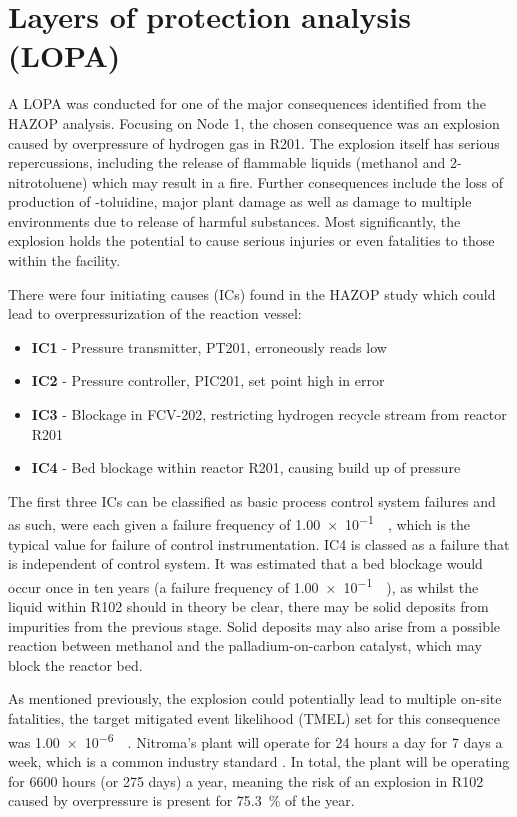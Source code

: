 \section{Layers of protection analysis (LOPA)}
\label{sec:LOPA}

A LOPA was conducted for one of the major consequences identified from the HAZOP analysis. Focusing on Node 1, the chosen consequence was an explosion caused by overpressure of hydrogen gas in R201. The explosion itself has serious repercussions, including the release of flammable liquids (methanol and 2-nitrotoluene) which may result in a fire. Further consequences include the loss of production of \ortho-toluidine, major plant damage as well as damage to multiple environments due to release of harmful substances. Most significantly, the explosion holds the potential to cause serious injuries or even fatalities to those within the facility. 

There were four initiating causes (ICs) found in the HAZOP study which could lead to overpressurization of the reaction vessel:

\begin{itemize}
\item \textbf{IC1} - Pressure transmitter, PT201, erroneously reads low 
\item \textbf{IC2} -  Pressure controller, PIC201, set point high in error
\item \textbf{IC3 }- Blockage in FCV-202, restricting hydrogen recycle stream from reactor R201 
\item \textbf{IC4} - Bed blockage within reactor R201, causing build up of pressure 
\end{itemize}

The first three ICs can be classified as basic process control system failures and as such, were each given a failure frequency of \SI{1.00e-1}{\per\year}, which is the typical value for failure of control instrumentation. IC4 is classed as a failure that is independent of control system. It was estimated that a bed blockage would occur once in ten years (a failure frequency of \SI{1.00e-1}{\per\year}), as whilst the liquid within R102 should in theory be clear, there may be solid deposits from impurities from the previous stage. Solid deposits may also arise from a possible reaction between methanol and the palladium-on-carbon catalyst, which may block the reactor bed. 

As mentioned previously, the explosion could potentially lead to multiple on-site fatalities, the target mitigated event likelihood (TMEL) set for this consequence was \SI{1.00e-6}{\per\year}. Nitroma's plant will operate for 24 hours a day for 7 days a week, which is a common industry standard \cite{job_guide_chemical_2021}. In total, the plant will be operating for 6600 hours (or 275 days) a year, meaning the risk of an explosion in R102 caused by overpressure is present for \SI{75.3}{\percent} of the year.  
 
